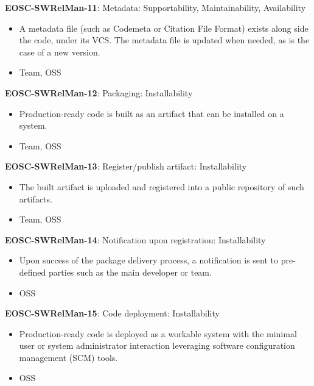 \textbf{EOSC-SWRelMan-11}: Metadata: Supportability, Maintainability, Availability

\begin{itemize}
    \item A metadata file (such as Codemeta or Citation File Format) exists along side the code, under its VCS. The metadata file is updated when needed, as is the case of a new version. \cite{orviz_set_2017}
    \item Team, OSS
\end{itemize}

\textbf{EOSC-SWRelMan-12}: Packaging: Installability

\begin{itemize}
    \item Production-ready code is  built as an artifact that can be installed on a system. \cite{shepherdson_cessda_2019,orviz_set_2017,raymond_software_2013}
    \item Team, OSS
\end{itemize}

\textbf{EOSC-SWRelMan-13}: Register/publish artifact: Installability

\begin{itemize}
    \item The built artifact is uploaded and registered into a public repository of such artifacts. \cite{orviz_set_2017}
    \item Team, OSS
\end{itemize}

\textbf{EOSC-SWRelMan-14}: Notification upon registration: Installability

\begin{itemize}
    \item Upon success of the package delivery process, a notification is sent to pre-defined parties such as the main developer or team. \cite{orviz_set_2017}
    \item OSS
\end{itemize}

\textbf{EOSC-SWRelMan-15}: Code deployment: Installability

\begin{itemize}
    \item Production-ready code is deployed as a workable system with the minimal user or system administrator interaction leveraging software configuration management (SCM) tools. \cite{orviz_set_2017}
    \item OSS
\end{itemize}

